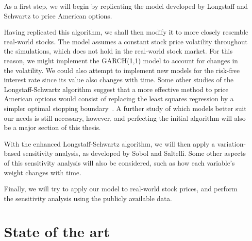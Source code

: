\documentclass[a4paper,twocolumn,aps,prd,longbibliography,superscriptaddress]{revtex4-1}
\begin{document}
As a first step, we will begin by replicating the model developed by Longstaff and Schwartz to price American options.

Having replicated this algorithm, we shall then modify it to more closely resemble real-world stocks.
The model assumes a constant stock price volatility throughout the simulations, which does not hold in the real-world stock market. For this reason, we might implement the GARCH(1,1) model to account for changes in the volatility.
We could also attempt to implement new models for the risk-free interest rate since its value also changes with time.
Some other studies of the Longstaff-Schwartz algorithm suggest that a more effective method to price American options would consist of replacing the least squares regression by a simpler optimal stopping boundary~\cite{Andersen}.
A further study of which models better suit our needs is still necessary, however, and perfecting the initial algorithm will also be a major section of this thesis.

With the enhanced Longstaff-Schwartz algorithm, we will then apply a variation-based sensitivity analysis, as developed by Sobol and Saltelli.
Some other aspects of this sensitivity analysis will also be considered, such as how each variable's weight changes with time.


Finally, we will try to apply our model to real-world stock prices, and perform the sensitivity analysis using the publicly available data.



\section{State of the art}
\end{document}
